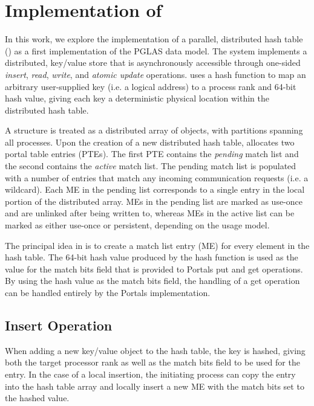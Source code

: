 \section{Implementation of \pdht}


In this work, we explore the implementation of a parallel, distributed hash
table (\pdht) as a first implementation of the PGLAS data model.
%
The \pdht system implements a distributed, key/value store that
is asynchronously accessible through one-sided {\em insert}, {\em
  read}, {\em write}, and {\em atomic update} operations.  \pdht uses
a hash function to map an arbitrary user-supplied key (i.e. a logical
address) to a process rank and 64-bit hash value, giving each key a
deterministic physical location within the distributed hash table.

A \pdht structure is treated as a distributed array of objects, with
partitions spanning all processes. Upon the creation of a new
distributed hash table, \pdht allocates two portal table
entries (PTEs). The first PTE contains the {\em pending} match list and the
second contains the {\em active} match list. The pending match list is
populated with a number of entries that match any incoming
communication requests (i.e. a wildcard). Each ME in the pending list
corresponds to a single entry in the local portion of the distributed
array. MEs in the pending list are marked as use-once and are unlinked
after being written to, whereas MEs in the active list can be marked as either
use-once or persistent, depending on the usage model.

The principal idea in \pdht is to create a match list entry (ME) for
every element in the hash table. The 64-bit hash value produced by the
hash function is used as the value for the match bits field that is provided
to Portals put and get operations. By using the hash value as
the match bits field, the handling of a get operation can be
handled entirely by the Portals implementation.


\subsection{Insert Operation}

When adding a new key/value object to the hash table, the key is
hashed, giving both the target processor rank as well as the match
bits field to be used for the entry. In the case of a local insertion,
the initiating process can copy the entry into the hash table array and
locally insert a new ME with the match bits set to the hashed value. 

